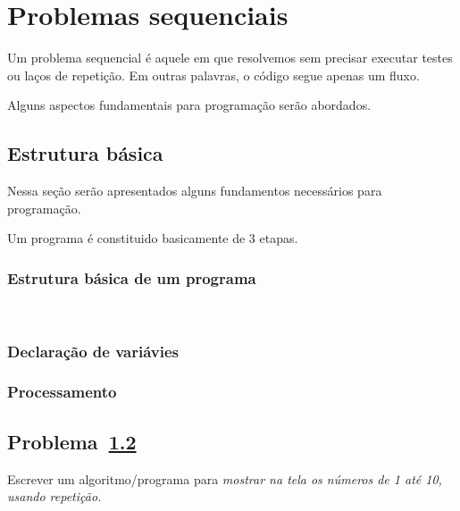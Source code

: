 \chapter{Problemas sequenciais}
\label{seq}

Um problema sequencial é aquele em que resolvemos sem precisar executar testes ou laços de repetição. Em outras palavras, o código segue apenas um fluxo.

Alguns aspectos fundamentais para programação serão abordados.

\section{Estrutura básica}
\label{estrutra}
Nessa seção serão apresentados alguns fundamentos necessários para programação.

Um programa é constituido basicamente de 3 etapas.



\subsection{Estrutura básica de um programa}
\

\subsection{Declaração de variávies}
\subsection{Processamento}
\subsection{}

\section{Problema~\ref{problema(while1)}}
\label{problema(while1)}
Escrever um algoritmo/programa para \emph{mostrar na tela os números de 1 até 10, usando repetição.}
